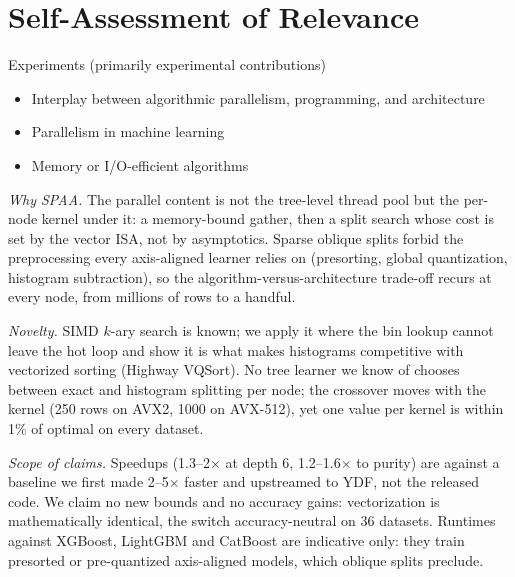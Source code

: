 \section*{Self-Assessment of Relevance}

Experiments (primarily experimental contributions)

\begin{itemize}
\item Interplay between algorithmic parallelism, programming, and architecture
\item Parallelism in machine learning
\item Memory or I/O-efficient algorithms
\end{itemize}

\emph{Why SPAA.} The parallel content is not the tree-level thread pool but the per-node kernel under it: a memory-bound gather, then a split search whose cost is set by the vector ISA, not by asymptotics. Sparse oblique splits forbid the preprocessing every axis-aligned learner relies on (presorting, global quantization, histogram subtraction), so the algorithm-versus-architecture trade-off recurs at every node, from millions of rows to a handful.

\emph{Novelty.} SIMD $k$-ary search is known; we apply it where the bin lookup cannot leave the hot loop and show it is what makes histograms competitive with vectorized sorting (Highway VQSort). No tree learner we know of chooses between exact and histogram splitting per node; the crossover moves with the kernel (250 rows on AVX2, 1000 on AVX-512), yet one value per kernel is within 1\% of optimal on every dataset.

\emph{Scope of claims.} Speedups (1.3--2$\times$ at depth 6, 1.2--1.6$\times$ to purity) are against a baseline we first made 2--5$\times$ faster and upstreamed to YDF, not the released code. We claim no new bounds and no accuracy gains: vectorization is mathematically identical, the switch accuracy-neutral on 36 datasets. Runtimes against XGBoost, LightGBM and CatBoost are indicative only: they train presorted or pre-quantized axis-aligned models, which oblique splits preclude.
